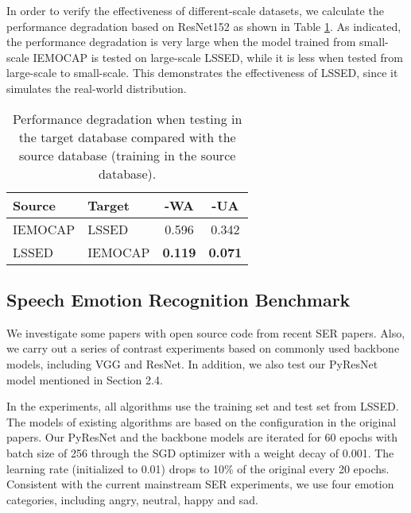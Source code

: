 \documentclass{article}
\begin{document}
In order to verify the effectiveness of different-scale datasets, we calculate the performance degradation based on ResNet152 as shown in Table \ref{tab:results_3}.
As indicated, the performance degradation is very large when the model trained from small-scale IEMOCAP\cite{busso2008iemocap} is tested on large-scale LSSED, while it is less when tested from large-scale to small-scale. 
This demonstrates the effectiveness of LSSED, since it simulates the real-world distribution.

\begin{table}[htbp]
  \caption{Performance degradation when testing in the target database compared with the source database (training in the source database).}
  \label{tab:results_3}
\centering
  \begin{tabular}{ ll|cc }
    \hline
    \textbf{Source} & \textbf{Target} & \textbf{-WA} & \textbf{-UA}\\
    \hline
    IEMOCAP  &  LSSED      &   0.596  &   0.342  \\
    LSSED   &  IEMOCAP     &   \textbf{0.119}   &   \textbf{0.071}  \\
    \hline
    \end{tabular}
\end{table}

\subsection{Speech Emotion Recognition Benchmark}
We investigate some papers \cite{zhang2018attention, guizzo2020multi, ren2020generating} with open source code from recent SER papers.
Also, we carry out a series of contrast experiments based on commonly used backbone models, including VGG and ResNet.
In addition, we also test our PyResNet model mentioned in Section 2.4.


In the experiments, all algorithms use the training set and test set from LSSED.
The models of existing algorithms are based on the configuration in the original papers.
Our PyResNet and the backbone models are iterated for 60 epochs with batch size of 256 through the SGD optimizer with a weight decay of 0.001.
The learning rate (initialized to 0.01) drops to 10\% of the original every 20 epochs.
Consistent with the current mainstream SER experiments, we use four emotion categories, including angry, neutral, happy and sad.
\end{document}
